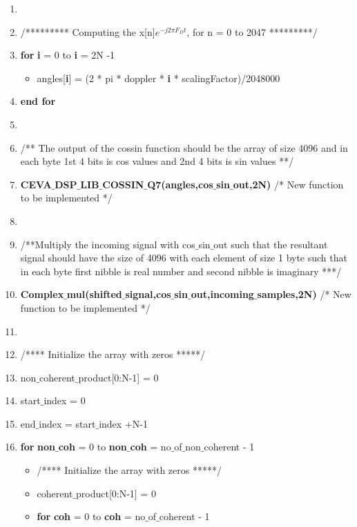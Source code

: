 \documentclass[journal,10pt,onecolumn]{article}
\begin{document}
\begin{itemize}
\begin{enumerate}
\begin{enumerate}
        \item[] 
        \item[]  /********* Computing the x[n]$e^{-j2 \pi F_Dt}$, for n = 0 to 2047 *********/
        \item[] \textbf{for} \textbf{i} = 0 to \textbf{i} = 2N -1
        \begin{itemize}
            \item[] angles[\textbf{i}] = (2 * pi * doppler * \textbf{i} * scalingFactor)/2048000
        \end{itemize}
        \item[] \textbf{end for}
        \item[] 
        \item[] /** The output of the cossin function should be the array of size 4096 and in each byte 1st 4 bits is cos values and 2nd 4 bits is sin values **/
        \item[] \textbf{CEVA$\_$DSP$\_$LIB$\_$COSSIN$\_$Q7(angles,cos$\_$sin$\_$out,2N)} /* New function to be implemented */
        \item[]
        \item[] /**Multiply the incoming signal with cos$\_$sin$\_$out such that the resultant signal should have the size of 4096 with each element of size 1 byte such that in each byte first nibble is real number and second nibble is imaginary ***/
        \item[] \textbf{Complex$\_$mul(shifted$\_$signal,cos$\_$sin$\_$out,incoming$\_$samples,2N)} /* New function to be implemented */
        \item[] 
        \item[] /**** Initialize the array with zeros *****/
        \item[] non$\_$coherent$\_$product[0:N-1] = 0
        \item[] start$\_$index = 0
        \item[] end$\_$index = start$\_$index +N-1
        \item[] \textbf{for}  \textbf{non$\_$coh} = 0 to  \textbf{non$\_$coh} =  no$\_$of$\_$non$\_$coherent - 1
        \begin{itemize}
            \item[] /**** Initialize the array with zeros *****/
            \item[] coherent$\_$product[0:N-1] = 0
            \item[] \textbf{for} \textbf{coh} = 0 to  \textbf{coh} = no$\_$of$\_$coherent - 1
            \begin{itemize}

\end{itemize}
\end{itemize}
\end{enumerate}
\end{enumerate}
\end{itemize}
\end{document}

